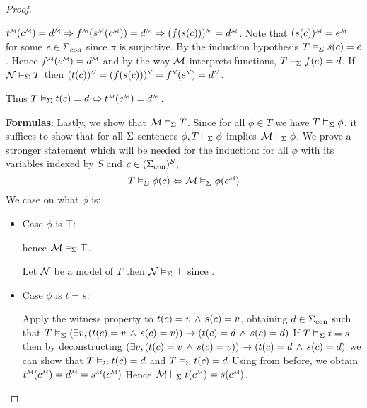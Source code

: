 \begin{proof}
\begin{itemize}
        \begin{backward} 
            $\mmintp{t}(\mmintp{c}) = \mmintp{d} \implies
            \mmintp{f}(\mmintp{s}(\mmintp{c})) = \mmintp{d} \implies 
            \mmintp{(f(s(c)))} = \mmintp{d}$.
            Note that $\mmintp{(s(c))} = \mmintp{e}$ 
            for some $e \in {\Sigma}_\mathrm{con}$ 
            since $\pi$ is surjective.
            By the induction hypothesis $T \vDash_{\Sigma} s(c) = e$.
            Hence $\mmintp{f}(\mmintp{e}) = \mmintp{d}$
            and by the way $\mathcal{M}$ interprets functions,
            $T \vDash_{\Sigma} f(e) = d$.
            If $\mathcal{N} \vDash_{\Sigma} T$ then 
            $\modintp{\NN}{(t(c))} = \modintp{\NN}{(f(s(c)))} = 
            \modintp{\NN}{f}(\modintp{\NN}{e}) = \modintp{\NN}{d}$.
        \end{backward}
    \end{itemize}
    Thus $T \modelsi t(c) = d \iff \mmintp{t}(\mmintp{c}) = \mmintp{d}$.

    \textbf{Formulas}:
    Lastly, we show that $\mathcal{M} \vDash_{\Sigma} T$. 
    Since for all
    $\phi \in T$ we have $T \vDash_{\Sigma} \phi$,
    it suffices to show that for all $\Sigma$-sentences
    $\phi, T \vDash_{\Sigma} \phi $ 
    implies $\mathcal{M} \vDash_{\Sigma} \phi$.
    We prove a stronger statement
    which will be needed for the induction:
    for all $\phi$ with its variables indexed by $S$ and 
    $c \in ({\Sigma}_\mathrm{con})^S$,
    \[
        T \modelsi \phi(c) \iff \MM \modelsi \phi(\mmintp{c})
    \]
    We case on what $\phi$ is:
    \begin{itemize}
        \item Case $\phi$ is $\top$:
            \begin{forward}
                hence $\mathcal{M} \vDash_{\Sigma} \top$.
            \end{forward}
            \begin{backward}
                Let $\mathcal{N}$ be a model of $T$ then $\mathcal{N} \vDash_{\Sigma} \top$
                since .
            \end{backward}
        \item Case $\phi$ is $t = s$: 
            \begin{forward} 
                Apply the witness property to 
                $t(c) = v \, \land \, s(c) = v$,
                obtaining $d \in {\Sigma}_\mathrm{con}$ such that
                $T \vDash_{\Sigma} (
                    \exists v, (t(c) = v \, \land \, s(c) = v)
                    ) 
                    \to (t(c) = d \, \land \, s(c) = d)$
                If $T \vDash_{\Sigma} t = s$ then by deconstructing 
                $(
                    \exists v, (t(c) = v \, \land \, s(c) = v)
                    ) 
                    \to (t(c) = d \, \land \, s(c) = d)$ 
                we can show that
                $T \vDash_{\Sigma} t(c) = d$ and $T \vDash_{\Sigma} t(c) = d$
                Using  from before, 
                we obtain
                $\mmintp{t}(\mmintp{c}) = \mmintp{d} = 
                \mmintp{s}(\mmintp{c}) 
            $
            Hence $\MM \modelsi t(\mmintp{c}) = s(\mmintp{c})$.
            \end{forward}


\end{itemize}
\end{proof}
